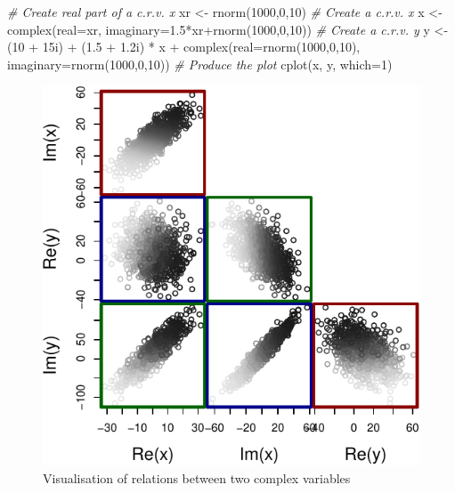 \documentclass[
]{book}
\newenvironment{Shaded}{\begin{snugshade}}{\end{snugshade}}
\newcommand{\AttributeTok}[1]{\textcolor[rgb]{0.77,0.63,0.00}{#1}}
\newcommand{\CommentTok}[1]{\textcolor[rgb]{0.56,0.35,0.01}{\textit{#1}}}
\newcommand{\DecValTok}[1]{\textcolor[rgb]{0.00,0.00,0.81}{#1}}
\newcommand{\FloatTok}[1]{\textcolor[rgb]{0.00,0.00,0.81}{#1}}
\newcommand{\FunctionTok}[1]{\textcolor[rgb]{0.00,0.00,0.00}{#1}}
\newcommand{\NormalTok}[1]{#1}
\newcommand{\OtherTok}[1]{\textcolor[rgb]{0.56,0.35,0.01}{#1}}
\newcommand{\SpecialCharTok}[1]{\textcolor[rgb]{0.00,0.00,0.00}{#1}}
\begin{document}
\begin{Shaded}
\begin{Highlighting}[]
\CommentTok{\# Create real part of a c.r.v. x}
\NormalTok{xr }\OtherTok{\textless{}{-}} \FunctionTok{rnorm}\NormalTok{(}\DecValTok{1000}\NormalTok{,}\DecValTok{0}\NormalTok{,}\DecValTok{10}\NormalTok{)}
\CommentTok{\# Create a c.r.v. x}
\NormalTok{x }\OtherTok{\textless{}{-}} \FunctionTok{complex}\NormalTok{(}\AttributeTok{real=}\NormalTok{xr, }\AttributeTok{imaginary=}\FloatTok{1.5}\SpecialCharTok{*}\NormalTok{xr}\SpecialCharTok{+}\FunctionTok{rnorm}\NormalTok{(}\DecValTok{1000}\NormalTok{,}\DecValTok{0}\NormalTok{,}\DecValTok{10}\NormalTok{))}
\CommentTok{\# Create a c.r.v. y}
\NormalTok{y }\OtherTok{\textless{}{-}}\NormalTok{ (}\DecValTok{10} \SpecialCharTok{+}\NormalTok{ 15i) }\SpecialCharTok{+}\NormalTok{ (}\FloatTok{1.5} \SpecialCharTok{+} \FloatTok{1.2}\NormalTok{i) }\SpecialCharTok{*}\NormalTok{ x }\SpecialCharTok{+}
    \FunctionTok{complex}\NormalTok{(}\AttributeTok{real=}\FunctionTok{rnorm}\NormalTok{(}\DecValTok{1000}\NormalTok{,}\DecValTok{0}\NormalTok{,}\DecValTok{10}\NormalTok{), }\AttributeTok{imaginary=}\FunctionTok{rnorm}\NormalTok{(}\DecValTok{1000}\NormalTok{,}\DecValTok{0}\NormalTok{,}\DecValTok{10}\NormalTok{))}
\CommentTok{\# Produce the plot}
\FunctionTok{cplot}\NormalTok{(x, y, }\AttributeTok{which=}\DecValTok{1}\NormalTok{)}
\end{Highlighting}
\end{Shaded}

\begin{figure}
\centering
\includegraphics{Svetunkov---Svetunkov---Complex-Valued-Econometrics_files/figure-latex/crvScatterplots-1.pdf}
\caption{\label{fig:crvScatterplots}Visualisation of relations between two complex variables}
\end{figure}
\end{document}
